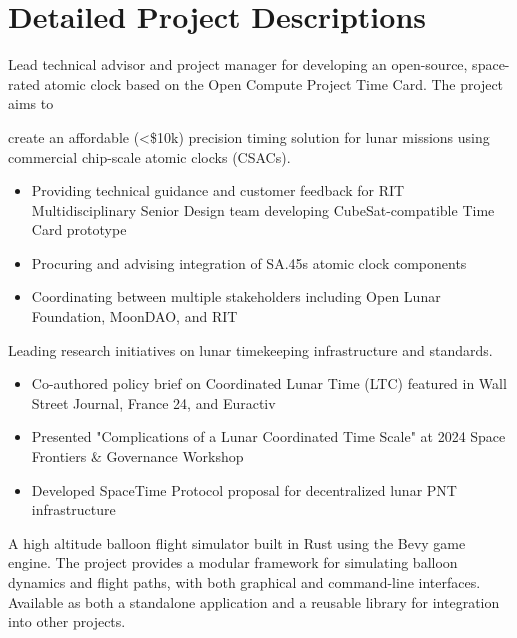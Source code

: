 \documentclass[10pt,final,sans]{resume}
\begin{document}
\break
\section{Detailed Project Descriptions}
 Lead
technical advisor and project manager for developing an open-source, space-rated
atomic clock based on the Open Compute Project Time Card. The project aims to

create an affordable (<\$10k) precision timing solution for lunar missions using
commercial chip-scale atomic clocks (CSACs).

\begin{itemize}
    \item Providing technical guidance and customer feedback for RIT Multidisciplinary Senior Design team developing CubeSat-compatible Time Card prototype
    \item Procuring and advising integration of SA.45s atomic clock components
    \item Coordinating between multiple stakeholders including Open Lunar Foundation, MoonDAO, and RIT
\end{itemize}

Leading research initiatives on lunar timekeeping infrastructure and standards.
\begin{itemize}
    \item Co-authored policy brief on Coordinated Lunar Time (LTC) featured in Wall Street Journal, France 24, and Euractiv
    \item Presented "Complications of a Lunar Coordinated Time Scale" at 2024 Space Frontiers \& Governance Workshop
    \item Developed SpaceTime Protocol proposal for decentralized lunar PNT infrastructure
\end{itemize}

 A high altitude balloon flight simulator built
in Rust using the Bevy game engine. The project provides a modular framework for
simulating balloon dynamics and flight paths, with both graphical and command-line
interfaces. Available as both a standalone application and a reusable library for
integration into other projects.
\end{document}
